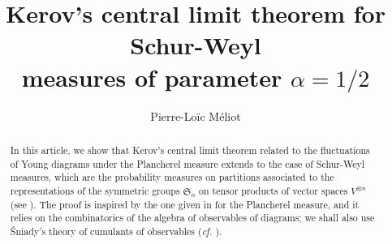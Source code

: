 \documentclass[10pt]{amsart}
\begin{document}
\author{Pierre-Lo\"ic M\'eliot}
\title[Kerov's central limit theorem for Schur-Weyl measures]{Kerov's central limit theorem for Schur-Weyl \\ measures of parameter $\alpha=1/2$}
\address{The Gaspard--Monge Institut of electronic and computer science,
University of Marne-La-Vall\'ee Paris-Est,
77454 Marne-la-Vall\'ee Cedex 2, France}

\newcommand{\Z}{\mathbb{Z}}     
\newcommand{\N}{\mathbb{N}}    
\newcommand{\R}{\mathbb{R}}    
\newcommand{\C}{\mathbb{C}}    
\newcommand{\I}{\mathrm{i}}
\newcommand{\sym}{\mathfrak{S}}
\newcommand{\Comp}{\mathfrak{C}}   
\newcommand{\Part}{\mathfrak{P}}      
\newcommand{\proba}{\mathbb{P}}     
\newcommand{\esper}{\mathbb{E}}     
\newcommand{\card}{\mathrm{card}}  
\newcommand{\obs}{\mathscr{O}}
\newcommand{\GL}{\mathrm{GL}}
\newcommand{\SWa}{\mathrm{SW}_{n,\alpha,c}}
\newcommand{\wt}{\mathrm{wt}}
\newcommand{\eps}{\varepsilon}
\newcommand{\tilh}{\widetilde{h}}
\newcommand{\tilp}{\widetilde{p}}
\newcommand{\tilq}{\widetilde{q}}
\newcommand{\tr}{\mathrm{tr}}
\newcommand{\lle}{\left[\!\left[}              
\newcommand{\rre}{\right]\!\right]}    
\newcommand{\scal}[2]{\left\langle #1\vphantom{#2}\,\right |\left.#2 \vphantom{#1}\right\rangle}   
\newtheorem{theorem}{Theorem}
\newtheorem{proposition}[theorem]{Proposition}
\newtheorem{lemma}[theorem]{Lemma}
\newtheorem{corollary}[theorem]{Corollary}
\theoremstyle{remark}
\newtheorem*{example}{Example}
\newtheorem*{examples}{Examples}
\newcommand{\figcap}[2]{\begin{figure}[ht] \begin{center} 
							{\footnotesize{#1}} 
							\caption{#2} \end{center} \end{figure}}
\newcommand{\comment}[1]{}
	

\begin{abstract}
In this article, we show that Kerov's central limit theorem related to the fluctuations of Young diagrams under the Plancherel measure extends to the case of Schur-Weyl measures, which are the probability measures on partitions associated to the representations of the symmetric groups $\sym_{n}$ on tensor products of vector spaces $V^{\otimes n}$ (see \cite{Bia01}). The proof is inspired by the one given in \cite{IO02} for the Plancherel measure, and it relies on the combinatorics of the algebra of observables of diagrams; we shall also use \'Sniady's theory of cumulants of observables (\emph{cf.} \cite{Sni06}).
\end{abstract}
\maketitle
\end{document}
